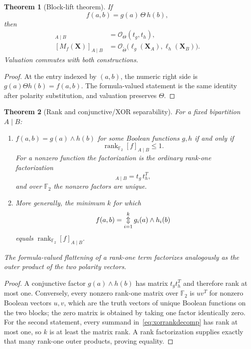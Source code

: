 \documentclass[11pt]{article}
\newtheorem{theorem}{Theorem}[section]
\theoremstyle{definition}
\theoremstyle{remark}
\newcommand{\F}{\mathbb F}
\newcommand{\cO}{\mathcal O}
\newcommand{\bigxor}{\mathop{\Updownarrow}\displaylimits}
\begin{document}
\begin{theorem}[Block-lift theorem]
If
\[
 f(a,b)=g(a)\,\Theta\,h(b),
\]
then
\begin{align}
 [f]_{A\mid B}&=\cO_\Theta(t_g,t_h),
 \label{eq:blocklift}\\
 [M_f(\mathbf X)]_{A\mid B}&=\cO_{\widetilde\Theta}\bigl(\ell_g(\mathbf X_A),\ell_h(\mathbf X_B)\bigr).
 \label{eq:symbolicblocklift}
\end{align}
Valuation commutes with both constructions.
\end{theorem}
\begin{proof}
At the entry indexed by $(a,b)$, the numeric right side is $g(a)\Theta h(b)=f(a,b)$.  The formula-valued statement is the same identity after polarity substitution, and valuation preserves $\Theta$.
\end{proof}

\begin{theorem}[Rank and conjunctive/XOR separability]
For a fixed bipartition $A\mid B$:
\begin{enumerate}
\item $f(a,b)=g(a)\land h(b)$ for some Boolean functions $g,h$ if and only if
\[
 \operatorname{rank}_{\F_2}[f]_{A\mid B}\le 1.
\]
For a nonzero function the factorization is the ordinary rank-one factorization
\begin{equation}
 [f]_{A\mid B}=t_g\,t_h^T,
 \label{eq:separable}
\end{equation}
and over $\F_2$ the nonzero factors are unique.
\item More generally, the minimum $k$ for which
\begin{equation}
 f(a,b)=\bigxor_{i=1}^{k} g_i(a)\land h_i(b)
 \label{eq:xorrankdecomp}
\end{equation}
equals $\operatorname{rank}_{\F_2}[f]_{A\mid B}$.
\end{enumerate}
The formula-valued flattening of a rank-one term factorizes analogously as the outer product of the two polarity vectors.
\end{theorem}
\begin{proof}
A conjunctive factor $g(a)\land h(b)$ has matrix $t_g t_h^T$ and therefore rank at most one.  Conversely, every nonzero rank-one matrix over $\F_2$ is $uv^T$ for nonzero Boolean vectors $u,v$, which are the truth vectors of unique Boolean functions on the two blocks; the zero matrix is obtained by taking one factor identically zero.  For the second statement, every summand in~\eqref{eq:xorrankdecomp} has rank at most one, so $k$ is at least the matrix rank.  A rank factorization supplies exactly that many rank-one outer products, proving equality.
\end{proof}
\end{document}
